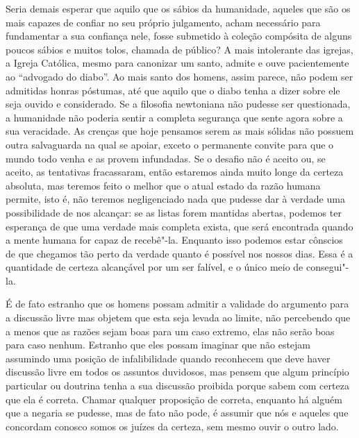 Seria demais esperar que aquilo que os sábios da humanidade, aqueles que
são os mais capazes de confiar no seu próprio julgamento, acham
necessário para \mbox{fundamentar} a sua confiança nele, fosse submetido à
coleção compósita de alguns poucos sábios e muitos tolos, chamada de
público? A mais intolerante das igrejas, a Igreja Católica, mesmo para
canonizar um santo, admite e ouve pacientemente ao ``advogado do
diabo''. Ao mais santo dos homens, assim parece, não podem ser admitidas
honras póstumas, até que aquilo que o diabo tenha a dizer sobre ele
seja ouvido e considerado. Se a filosofia newtoniana não pudesse ser
questionada, a humanidade não poderia sentir a completa segurança que
sente agora sobre a sua veracidade. As crenças que hoje pensamos serem as
mais sólidas não possuem outra salvaguarda na qual se apoiar, exceto o
permanente convite para que o mundo todo venha e as provem infundadas.
Se o desafio não é aceito ou, se aceito, as tentativas fracassaram, então
estaremos ainda muito longe da certeza absoluta, mas teremos feito o
melhor que o atual estado da razão humana permite, isto é, não teremos
negligenciado nada que pudesse dar à verdade uma possibilidade de nos
alcançar: se as listas forem mantidas abertas, podemos ter esperança de
que uma verdade mais completa exista, que será encontrada quando a
mente humana for capaz de recebê"-la. Enquanto isso podemos estar
cônscios de que chegamos tão perto da verdade quanto é possível nos
nossos dias. Essa é a quantidade de certeza alcançável por um ser
falível, e o único meio de consegui"-la. 

É de fato estranho que os homens possam admitir a validade do argumento
para a discussão livre mas objetem que esta seja levada ao limite,
não percebendo que a menos que as razões sejam boas para um caso
extremo, elas não serão boas para caso nenhum. Estranho que eles possam
imaginar que não estejam assumindo uma posição de infalibilidade
quando reconhecem que deve haver discussão livre em todos os assuntos
duvidosos, mas pensem que algum princípio particular ou doutrina tenha
a sua discussão proibida porque sabem com certeza que ela é
correta. Chamar qualquer proposição de correta, enquanto há alguém que
a negaria se pudesse, mas de fato não pode, é assumir que nós e aqueles que
concordam conosco somos os juízes da certeza, sem mesmo ouvir o outro lado. 

